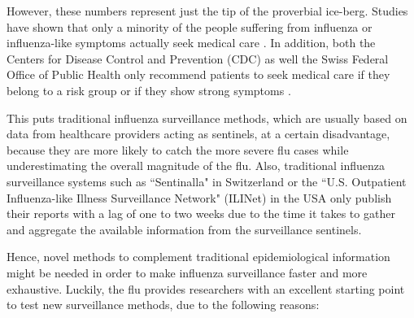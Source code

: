 \documentclass[11pt, a4paper,twoside]{report}\usepackage[]{graphicx}\usepackage[]{color}
\begin{document}
However, these numbers represent just the tip of the proverbial ice-berg. Studies have shown that only a minority of the people suffering from influenza or influenza-like symptoms actually seek medical care \citep{goff_surveillance_2015}. In addition, both the Centers for Disease Control and Prevention (CDC) as well the Swiss Federal Office of Public Health only recommend patients to seek medical care if they belong to a risk group or if they show strong symptoms \citep{bag_grippe_2016,cdc_flu_2017}.

This puts traditional influenza surveillance methods, which are usually based on data from healthcare providers acting as sentinels, at a certain disadvantage, because they are more likely to catch the more severe flu cases while underestimating the overall magnitude of the flu. Also, traditional influenza surveillance systems such as ``Sentinalla" in Switzerland \citep{bag_influenza_2017, sentinella_2017} or the ``U.S. Outpatient Influenza-like Illness Surveillance Network" (ILINet) in the USA \citep{cdc_surveillance_2016} only publish their reports with a lag of one to two weeks due to the time it takes to gather and aggregate the available information from the surveillance sentinels.

Hence, novel methods to complement traditional epidemiological information might be needed in order to make influenza surveillance faster and more exhaustive. Luckily, the flu provides researchers with an excellent starting point to test new surveillance methods, due to the following reasons: 
\end{document}
